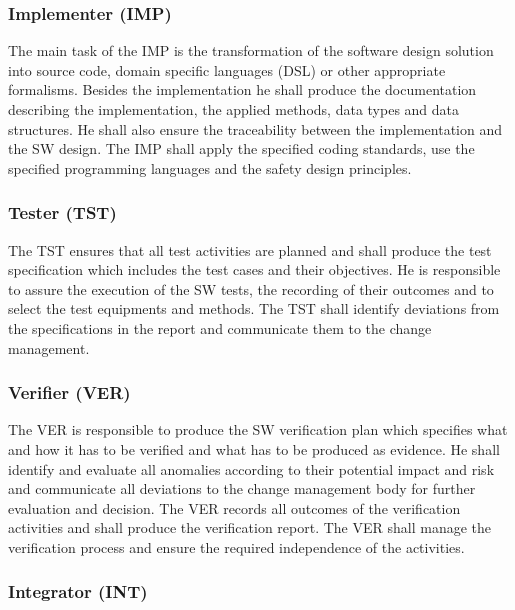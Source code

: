 \subsubsection{Implementer (IMP)}
\label{sec:implementer}

The main task of the IMP is the transformation of the software design solution
into source code, domain specific languages (DSL) or other appropriate
formalisms. Besides the implementation he shall produce the documentation
describing the implementation, the applied methods, data types and data
structures. He shall also ensure the traceability between the implementation and
the SW design. The IMP shall apply the specified coding standards, use the
specified programming languages and the safety design principles.

\subsubsection{Tester (TST)}
\label{sec:tester}

The TST ensures that all test activities are planned and shall produce the test
specification which includes the test cases and their objectives. He is
responsible to assure the execution of the SW tests, the recording of their
outcomes and to select the test equipments and methods. The TST shall identify
deviations from the specifications in the report and communicate them to the
change management.

\subsubsection{Verifier (VER)}
\label{sec:verifier}

The VER is responsible to produce the SW verification plan which specifies what
and how it has to be verified and what has to be produced as evidence. He shall
identify and evaluate all anomalies according to their potential impact and risk
and communicate all deviations to the change management body for further
evaluation and decision. The VER records all outcomes of the verification
activities and shall produce the verification report. The VER shall manage the
verification process and ensure the required independence of the activities.

\subsubsection{Integrator (INT)}
\label{sec:integrator}

